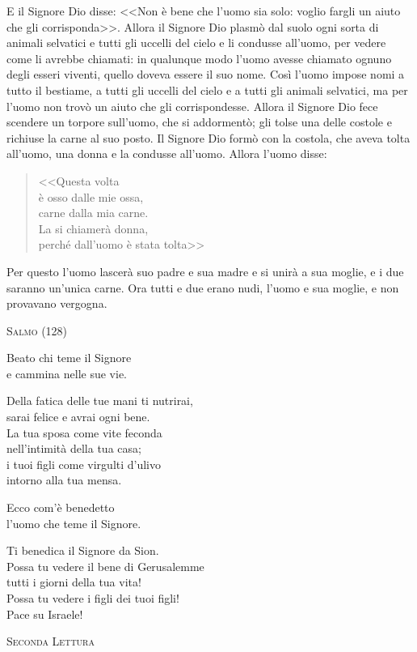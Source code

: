\documentclass[12pt,twoside]{article}
\newcommand{\masssubpart}[1]{\bigskip

  {\large\scshape #1}}
\begin{document}
E il Signore Dio disse: <<Non è bene che l'uomo sia solo: voglio fargli un aiuto che gli corrisponda>>. Allora il Signore Dio plasmò dal suolo ogni sorta di animali selvatici e tutti gli uccelli del cielo e li condusse all'uomo, per vedere come li avrebbe chiamati: in qualunque modo l'uomo avesse chiamato ognuno degli esseri viventi, quello doveva essere il suo nome. Così l'uomo impose nomi a tutto il bestiame, a tutti gli uccelli del cielo e a tutti gli animali selvatici, ma per l'uomo non trovò un aiuto che gli corrispondesse. Allora il Signore Dio fece scendere un torpore sull'uomo, che si addormentò; gli tolse una delle costole e richiuse la carne al suo posto. Il Signore Dio formò con la costola, che aveva tolta all'uomo, una donna e la condusse all'uomo. Allora l'uomo disse:
\begin{quote}
<<Questa volta\\
è osso dalle mie ossa,\\
carne dalla mia carne.\\
La si chiamerà donna,\\
perché dall'uomo è stata tolta>>
\end{quote}
Per questo l'uomo lascerà suo padre e sua madre e si unirà a sua moglie, e i due saranno un'unica carne.
Ora tutti e due erano nudi, l'uomo e sua moglie, e non provavano vergogna.

\newpage

\masssubpart{Salmo (128)}

Beato chi teme il Signore\\
e cammina nelle sue vie.

Della fatica delle tue mani ti nutrirai,\\
sarai felice e avrai ogni bene.\\
La tua sposa come vite feconda\\
nell'intimità della tua casa;\\
i tuoi figli come virgulti d'ulivo\\
intorno alla tua mensa.

Ecco com'è benedetto\\
l'uomo che teme il Signore.

Ti benedica il Signore da Sion.\\
Possa tu vedere il bene di Gerusalemme\\
tutti i giorni della tua vita!\\
Possa tu vedere i figli dei tuoi figli!\\
Pace su Israele!

\masssubpart{Seconda Lettura}
\end{document}
